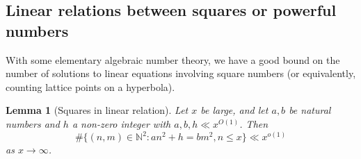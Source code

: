 \documentclass[12pt]{amsart}
\newtheorem{lemma}[theorem]{Lemma}
\newcommand{\N}{\mathbb{N}}
\begin{document}
\subsection{Linear relations between squares or powerful numbers}

With some elementary algebraic number theory, we have a good bound on the number of solutions to linear equations involving square numbers (or equivalently, counting lattice points on a hyperbola).

\begin{lemma}[Squares in linear relation]\label{squarecount}  Let $x$ be large, and let $a,b$ be natural numbers and $h$ a non-zero integer with $a,b,h \ll x^{O(1)}$.  Then
    $$ \# \{ (n,m) \in \N^2: an^2+h = bm^2, n \leq x \} \ll x^{o(1)}$$
    as $x \to \infty$.
\end{lemma}
\end{document}
